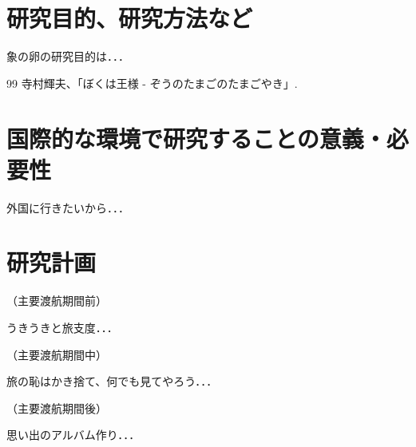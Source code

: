 \documentclass[11pt,a4j,dvipdfmx]{jarticle} 					%
\newcommand{\研究課題名}{象の卵}
\newcommand{\研究機関名}{逢坂大学}
\newcommand{\研究代表者氏名}{湯川秀樹}
\begin{document}

\section{研究目的、研究方法など}

	 象の卵の研究目的は．．．

	\vspace{1cm}
	\begin{thebibliography}{99}
		 寺村輝夫、「ぼくは王様 - ぞうのたまごのたまごやき」.
	\end{thebibliography}



\section{国際的な環境で研究することの意義・必要性}

	外国に行きたいから．．．




\section{研究計画}

\noindent
\mbox{（主要渡航期間前）}

	うきうきと旅支度．．．

\noindent
\mbox{（主要渡航期間中）}

	旅の恥はかき捨て、何でも見てやろう．．．

\noindent
\mbox{（主要渡航期間後）}

	思い出のアルバム作り．．．


\end{document}
